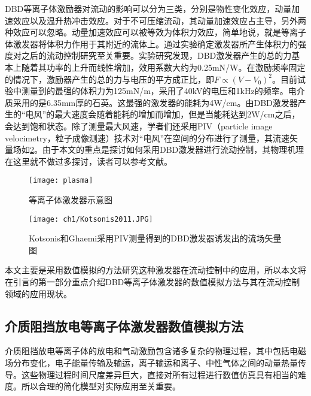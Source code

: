 DBD等离子体激励器对流动的影响可以分为三类，分别是物性变化效应，动量加速效应以及温升热冲击效应\cite{yu2017}。对于不可压缩流动，其动量加速效应占主导，另外两种效应可以忽略。动量加速效应可以被等效为体积力效应，简单地说，就是等离子体激发器将体积力作用于其附近的流体上。通过实验确定激发器所产生体积力的强度对之后的流动控制研究至关重要\cite{Enloe2004,Debien2012,Kriegseis2011,Hoskinson2010,Durscher2011}。实验研究发现，DBD激发器产生的总的力基本上随着其功率的上升而线性增加，效用系数大约为0.25mN/W\cite{Kriegseis2011}。在激励频率固定的情况下，激励器产生的总的力与电压的平方成正比\cite{Debien2012}，即$F\propto(V-V_0)^2$。目前试验中测量到的最强的体积力为125mN/m\cite{Thomas2009}，采用了40kV的电压和1kHz的频率。电介质采用的是6.35mm厚的石英。这最强的激发器的能耗为4W/cm。由DBD激发器产生的“电风”的最大速度会随着能耗的增加而增加，但是当能耗达到2W/cm之后，会达到饱和状态\cite{Jolibois2009}。除了测量最大风速，学者们还采用PIV（particle image velocimetry，粒子成像测速）技术对“电风”在空间的分布进行了测量\cite{Kotsonis2011,kriegseis2013velocity}，其流速矢量场如\ref{f:Kotsonis2011}。由于本文的重点是探讨如何采用DBD激发器进行流动控制，其物理机理在这里就不做过多探讨，读者可以参考文献\cite{Moreau2007,Benard2014}。

\begin{figure}
  \centering
  \texttt{[image: plasma]}
  \caption{等离子体激发器示意图\cite{Whalley2012}}\label{fig:SchematicPlasma}
\end{figure}
\begin{figure}
  \centering
  \texttt{[image: ch1/Kotsonis2011.JPG]}
  \caption{Kotsonis和Ghaemi\cite{Kotsonis2011}采用PIV测量得到的DBD激发器诱发出的流场矢量图}\label{f:Kotsonis2011}
\end{figure}
本文主要是采用数值模拟的方法研究这种激发器在流动控制中的应用，所以本文将在引言的第一部分重点介绍DBD等离子体激发器的数值模拟方法与其在流动控制领域的应用现状。


\subsection{介质阻挡放电等离子体激发器数值模拟方法}
介质阻挡放电等离子体的放电和气动激励包含诸多复杂的物理过程，其中包括电磁场分布变化，电子能量传输及输运，离子输运和离子、中性气体之间的动量热量传导。这些物理过程时间尺度差异巨大，直接对所有过程进行数值仿真具有相当的难度。所以合理的简化模型对实际应用至关重要。

